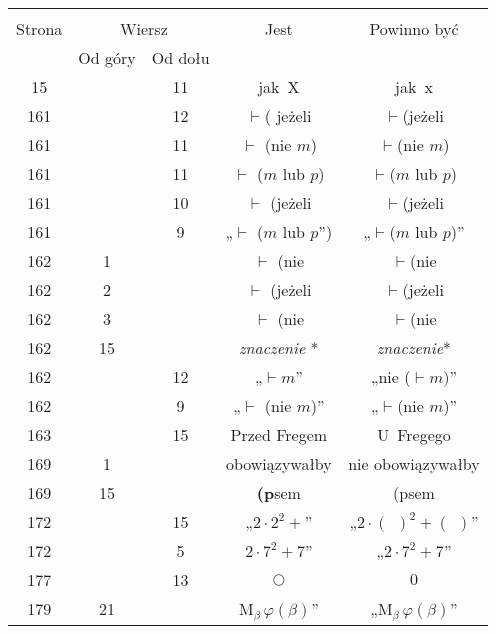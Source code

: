 \documentclass[a4paper,11pt]{article}
\begin{document}
\begin{center}

  \begin{tabular}{|c|c|c|c|c|}
    \hline
    & \multicolumn{2}{c|}{} & & \\
    Strona & \multicolumn{2}{c|}{Wiersz} & Jest
                              & Powinno być \\ \cline{2-3}
    & Od góry & Od dołu & & \\
    \hline
    15  & & 11 & jak~X & jak~x \\
    161 & & 12 & $\vdash$({ } jeżeli & $\vdash$(jeżeli \\
    161 & & 11 & $\vdash$ (nie $m$) & $\vdash$(nie $m$) \\
    161 & & 11 & $\vdash$ ($m${ } lub $p$) & $\vdash$($m$ lub $p$) \\
    161 & & 10 & $\vdash$ (jeżeli & $\vdash$(jeżeli \\
    161 & &  9 & „$\vdash$ ($m$ lub $p$”)
           & „$\vdash$($m$ lub $p$)” \\
    162 &  1 & & $\vdash$ (nie & $\vdash$(nie \\
    162 &  2 & & $\vdash$ (jeżeli & $\vdash$(jeżeli \\
    162 &  3 & & $\vdash$ (nie & $\vdash$(nie \\
    162 & 15 & & \textit{znaczenie} * & \textit{znaczenie}* \\
    162 & & 12 & „$\vdash m$” & „nie ($\vdash m)$” \\
    162 & &  9 & „$\vdash$ (nie $m$)” & „$\vdash$(nie $m$)” \\
    163 & & 15 & Przed Fregem & U~Fregego \\
    169 &  1 & & obowiązywałby & nie obowiązywałby \\
    169 & 15 & & \textbf{(p}sem & (psem \\
    172 & & 15 & „$2 \cdot 2^{ 2 } +$”
           & „$2 \cdot ( \:\: )^{ 2 } + ( \:\: )$” \\
    172 & &  5 & $2 \cdot 7^{ 2 } + 7$” & „$2 \cdot 7^{ 2 } + 7$” \\
    177 & & 13 & $\bigcirc$ & $0$ \\
    179 & 21 & & $\textrm{M}_{ \beta }\, \varphi( \beta )$”
           & „$\textrm{M}_{ \beta }\, \varphi( \beta )$” \\
    \hline
  \end{tabular}





\end{center}
\end{document}
